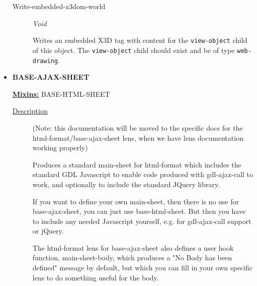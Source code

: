 \documentclass [11pt]{book}
\begin{document}
\begin{itemize}
\begin{description}

\item [Write-embedded-x3dom-world]
\emph{Void}

 Writes an embedded X3D tag with content for the \texttt{view-object} child of this object.
The \texttt{view-object} child should exist and be of type \texttt{web-drawing}.




\end{description}







\item {}
\label{prim:base-ajax-sheet}
\textbf{BASE-AJAX-SHEET}


\textbf{
\underline{Mixins:}} BASE-HTML-SHEET





\begin{description}

\item [
\underline{Description}]


(Note: this documentation will be moved
to the specific docs for the html-format/base-ajax-sheet lens, when 
we have lens documentation working properly)

Produces a standard main-sheet for html-format which includes the
standard GDL Javascript to enable code produced with gdl-ajax-call to
work, and optionally to include the standard JQuery library.

If you want to define your own main-sheet, then there is no use for
base-ajax-sheet, you can just use base-html-sheet. But then you have
to include any needed Javascript yourself, e.g. for gdl-ajax-call
support or jQuery.

The html-format lens for base-ajax-sheet also defines a user hook function,
main-sheet-body, which produces a "No Body has been defined" message by default, 
but which you can fill in your own specific lens to do something useful for the body.



\end{description}




\begin{figure}
\begin{lrbox}{\boxedverb}
\begin{minipage}{\linewidth}
{\small

}
\end{minipage}
\end{lrbox}
\end{figure}
\end{itemize}
\end{document}

